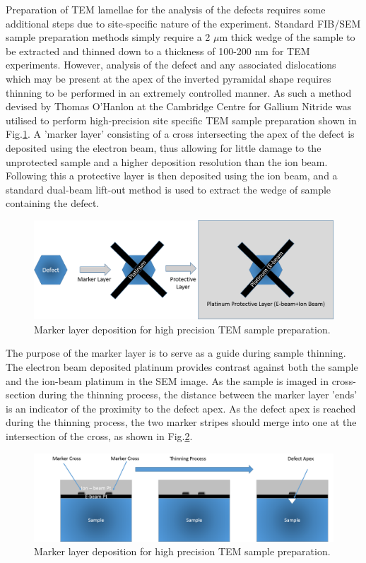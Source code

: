 Preparation of TEM lamellae for the analysis of the defects requires some additional steps due to site-specific nature of the experiment. Standard FIB/SEM sample preparation methods simply require a 2 $\mu$m thick wedge of the sample to be extracted and thinned down to a thickness of 100-200 nm for TEM experiments. However, analysis of the defect and any associated dislocations which may be present at the apex of the inverted pyramidal shape \cite{Watanabe2003,Shiojiri2006} requires thinning to be performed in an extremely controlled manner. As such a method devised by Thomas O'Hanlon at the Cambridge Centre for Gallium Nitride was utilised to perform high-precision site specific TEM sample preparation shown in Fig.\ref{FIBprep}. A 'marker layer' consisting of a cross intersecting the apex of the defect is deposited using the electron beam, thus allowing for little damage to the unprotected sample and a higher deposition resolution than the ion beam. Following this a protective layer is then deposited using the ion beam, and a standard dual-beam lift-out method is used to extract the wedge of sample containing the defect. 

\begin{figure}[!ht]
	\centering
	\includegraphics[width=1\textwidth]{Figs/Ch3/FIB-spot}
	\caption[h] {Marker layer deposition for high precision TEM sample preparation.}
	\label{FIBprep}
\end{figure}
\FloatBarrier 

The purpose of the marker layer is to serve as a guide during sample thinning. The electron beam deposited platinum provides contrast against both the sample and the ion-beam platinum in the SEM image. As the sample is imaged in cross-section during the thinning process, the distance between the marker layer 'ends' is an indicator of the proximity to the defect apex. As the defect apex is reached during the thinning process, the two marker stripes should merge into one at the intersection of the cross, as shown in Fig.\ref{FIBloc}.

\begin{figure}[!ht]
	\centering
	\includegraphics[width=1\textwidth]{Figs/Ch3/FIB-loc-diagram}
	\caption[h] {Marker layer deposition for high precision TEM sample preparation.}
	\label{FIBloc}
\end{figure}
\FloatBarrier 

